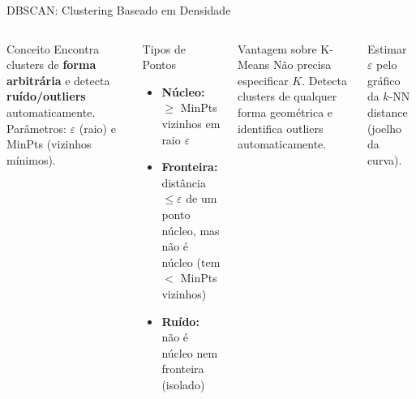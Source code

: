 \documentclass[aspectratio=169]{beamer}
\begin{document}
\begin{frame}[shrink=5]{DBSCAN: Clustering Baseado em Densidade}
    \begin{columns}
        \begin{block}{Conceito}
            \footnotesize
            Encontra clusters de \textbf{forma arbitrária} e detecta \textbf{ruído/outliers} automaticamente. Parâmetros: $\varepsilon$ (raio) e MinPts (vizinhos mínimos).
        \end{block}
        \begin{block}{Tipos de Pontos}
            \begin{itemize}\footnotesize
                \item \textcolor{mineblue}{\textbf{Núcleo:}} $\geq$ MinPts vizinhos em raio $\varepsilon$
                      
                \item \textcolor{minegreen}{\textbf{Fronteira:}} distância $\leq \varepsilon$ de um ponto núcleo,
                      mas não é núcleo (tem $<$ MinPts vizinhos)
                \item \textcolor{minered}{\textbf{Ruído:}} não é núcleo nem fronteira (isolado)
            \end{itemize}
        \end{block}
        \begin{alertblock}{Vantagem sobre K-Means}
            \footnotesize Não precisa especificar $K$. Detecta clusters de qualquer forma geométrica e identifica outliers automaticamente.
        \end{alertblock}
        \centering
        \vspace{0.1cm}
        \tiny Estimar $\varepsilon$ pelo gráfico da $k$-NN distance (joelho da curva).
    \end{columns}
\end{frame}
\end{document}
